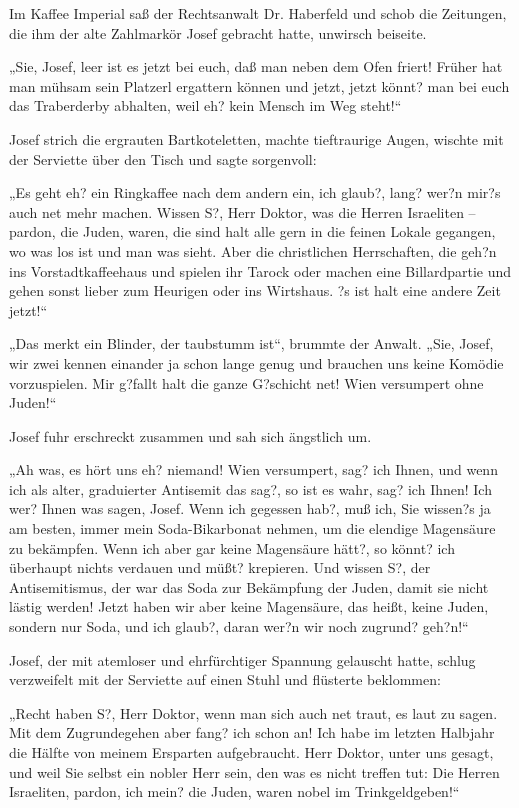 \tb{* * *}
Im Kaffee Imperial saß der Rechtsanwalt Dr. Haberfeld und schob die
Zeitungen, die ihm der alte Zahlmarkör Josef gebracht hatte,
unwirsch beiseite.

„Sie, Josef, leer ist es jetzt bei euch, daß man neben dem Ofen
friert! Früher hat man mühsam sein Platzerl ergattern können und
jetzt, jetzt könnt? man bei euch das Traberderby abhalten, weil eh?
kein Mensch im Weg steht!“

Josef strich die ergrauten Bartkoteletten, machte tieftraurige
Augen, wischte mit der Serviette über den Tisch und sagte
sorgenvoll:

„Es geht eh? ein Ringkaffee nach dem andern ein, ich glaub?, lang?
wer?n mir?s auch net mehr machen. Wissen S?, Herr Doktor, was die
Herren Israeliten – pardon, die Juden, waren, die sind halt alle
gern in die feinen Lokale gegangen, wo was los ist und man was
sieht. Aber die christlichen Herrschaften, die geh?n ins
Vorstadtkaffeehaus und spielen ihr Tarock oder machen eine
Billardpartie und gehen sonst lieber zum Heurigen oder ins
Wirtshaus. ?s ist halt eine andere Zeit jetzt!“

„Das merkt ein Blinder, der taubstumm ist“, brummte der Anwalt.
„Sie, Josef, wir zwei kennen einander ja schon lange genug und
brauchen uns keine Komödie vorzuspielen. Mir g?fallt halt die ganze
G?schicht net! Wien versumpert ohne Juden!“

Josef fuhr erschreckt zusammen und sah sich
ängstlich um.

„Ah was, es hört uns eh? niemand! Wien versumpert, sag? ich Ihnen,
und wenn ich als alter, graduierter Antisemit das sag?, so ist es
wahr, sag? ich Ihnen! Ich wer? Ihnen was sagen, Josef. Wenn ich
gegessen hab?, muß ich, Sie wissen?s ja am besten, immer mein
Soda-Bikarbonat nehmen, um die elendige Magensäure zu bekämpfen.
Wenn ich aber gar keine Magensäure hätt?, so könnt? ich überhaupt
nichts verdauen und müßt? krepieren. Und wissen S?, der
Antisemitismus, der war das Soda zur Bekämpfung der Juden, damit
sie nicht lästig werden! Jetzt haben wir aber keine Magensäure, das
heißt, keine Juden, sondern nur Soda, und ich glaub?, daran wer?n
wir noch zugrund? geh?n!“

Josef, der mit atemloser und ehrfürchtiger Spannung gelauscht
hatte, schlug verzweifelt mit der Serviette auf einen Stuhl und
flüsterte beklommen:

„Recht haben S?, Herr Doktor, wenn man sich auch net traut, es laut
zu sagen. Mit dem Zugrundegehen aber fang? ich schon an! Ich habe
im letzten Halbjahr die Hälfte von meinem Ersparten aufgebraucht.
Herr Doktor, unter uns gesagt, und weil Sie selbst ein nobler Herr
sein, den was es nicht treffen tut: Die Herren Israeliten, pardon,
ich mein? die Juden, waren nobel im Trinkgeldgeben!“

